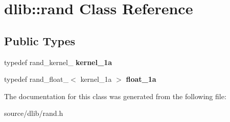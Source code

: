 \hypertarget{classdlib_1_1rand}{
\section{dlib::rand Class Reference}
\label{classdlib_1_1rand}
}
\subsection*{Public Types}
\begin{DoxyCompactItemize}
\item 
\hypertarget{classdlib_1_1rand_a65c91e0dc68fac0c2a204ac5c465f068}{
typedef rand\_\-kernel\_ {\bfseries kernel\_\-1a}}
\label{classdlib_1_1rand_a65c91e0dc68fac0c2a204ac5c465f068}

\item 
\hypertarget{classdlib_1_1rand_aed991af3ccf458d335819968d1c9c0f1}{
typedef rand\_\-float\_$<$ kernel\_\-1a $>$ {\bfseries float\_\-1a}}
\label{classdlib_1_1rand_aed991af3ccf458d335819968d1c9c0f1}

\end{DoxyCompactItemize}


The documentation for this class was generated from the following file:\begin{DoxyCompactItemize}
\item 
source/dlib/rand.h\end{DoxyCompactItemize}
